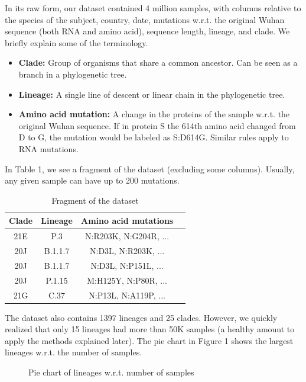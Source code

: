 \documentclass[twoside,twocolumn]{article}
\begin{document}
	In its raw form, our dataset contained 4 million samples, with columns relative to the species of the subject, country, date, mutations w.r.t. the original Wuhan sequence (both RNA and amino acid), sequence length, lineage, and clade. We briefly explain some of the terminology.
	\begin{itemize}
		\item \textbf{Clade: }Group of organisms that share a common ancestor. Can be seen as a branch in a phylogenetic tree.
		\item \textbf{Lineage: } A single line of descent or linear chain in the phylogenetic tree.
		\item \textbf{Amino acid mutation: } A change in the proteins of the sample w.r.t. the original Wuhan sequence. If in protein S the 614th amino acid changed from D to G, the mutation would be labeled as S:D614G. Similar rules apply to RNA mutations\cite{nomenclature}.
	\end{itemize}
	In Table 1, we see a fragment of the dataset (excluding some columns). Usually, any given sample can have up to 200 mutations. 
	\begin{table}
		\caption{Fragment of the dataset}
		\centering
		\renewcommand{\arraystretch}{1.2} %
		\begin{tabular}{|c|c|c|c|}
			\hline
			Clade & Lineage & Amino acid mutations \\
			\hline
			21E  & P.3& N:R203K, N:G204R, ... \\
			20J & B.1.1.7 & N:D3L, N:R203K, ...\\
			20J & B.1.1.7 & N:D3L, N:P151L, ...\\
			20J & P.1.15 & M:H125Y, N:P80R, ...\\
			21G & C.37 & N:P13L, N:A119P, ...\\
			\hline
		\end{tabular}
	\end{table}
	The dataset also contains 1397 lineages and 25 clades. However, we quickly realized that only 15 lineages had more than 50K samples (a healthy amount to apply the methods explained later). The pie chart in Figure 1 shows the largest lineages w.r.t. the number of samples. 
	\begin{figure}
		\caption{Pie chart of lineages w.r.t. number of samples} \label{piechart}
	\end{figure}
\end{document}
